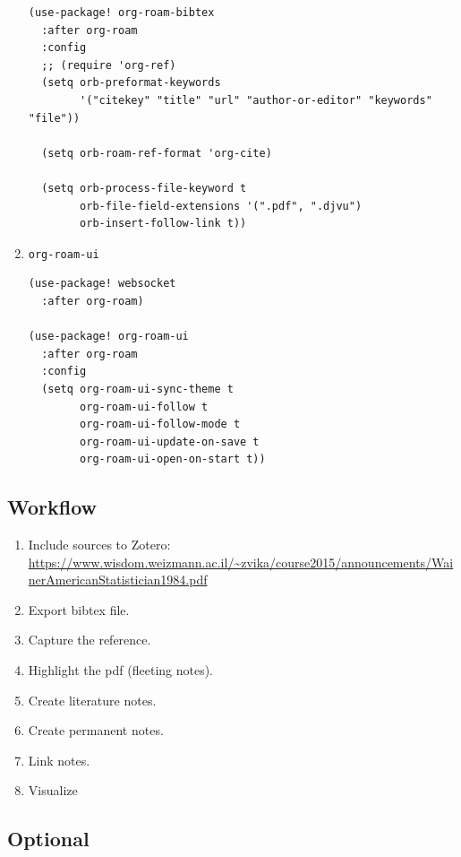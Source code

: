 \documentclass[11pt]{article}
\begin{document}
\begin{enumerate}
\begin{verbatim}
(use-package! org-roam-bibtex
  :after org-roam
  :config
  ;; (require 'org-ref)
  (setq orb-preformat-keywords
        '("citekey" "title" "url" "author-or-editor" "keywords" "file"))

  (setq orb-roam-ref-format 'org-cite)

  (setq orb-process-file-keyword t
        orb-file-field-extensions '(".pdf", ".djvu")
        orb-insert-follow-link t))
\end{verbatim}


\item \texttt{org-roam-ui}
\label{sec:orgd9126b3}
\begin{verbatim}
(use-package! websocket
  :after org-roam)

(use-package! org-roam-ui
  :after org-roam
  :config
  (setq org-roam-ui-sync-theme t
        org-roam-ui-follow t
        org-roam-ui-follow-mode t
        org-roam-ui-update-on-save t
        org-roam-ui-open-on-start t))
\end{verbatim}
\end{enumerate}

\subsection{Workflow}
\label{sec:orga3c2437}

\begin{enumerate}
\item Include sources to Zotero: \url{https://www.wisdom.weizmann.ac.il/\~zvika/course2015/announcements/WainerAmericanStatistician1984.pdf}
\item Export bibtex file.
\item Capture the reference.
\item Highlight the pdf (fleeting notes).
\item Create literature notes.
\item Create permanent notes.
\item Link notes.
\item Visualize
\end{enumerate}

\subsection{Optional}
\label{sec:orge3c4190}
\end{document}
